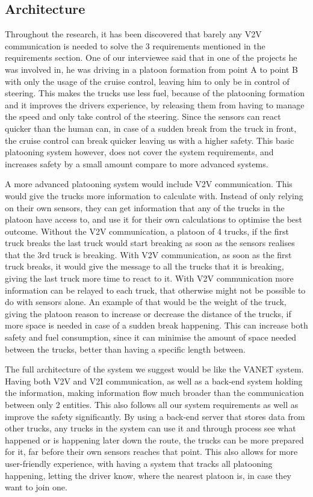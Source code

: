 \subsection{Architecture}
%
Throughout the research, it has been discovered that barely any V2V communication is needed to solve the 3 requirements mentioned in the requirements section. One of our interviewee said that in one of the projects he was involved in, he was driving in a platoon formation from point A to point B with only the usage of the cruise control, leaving him to only be in control of steering. This makes the trucks use less fuel, because of the platooning formation and it improves the drivers experience, by releasing them from having to manage the speed and only take control of the steering. Since the sensors can react quicker than the human can, in case of a sudden break from the truck in front, the cruise control can break quicker leaving us with a higher safety. This basic platooning system however, does not cover the system requirements, and increases safety by a small amount compare to more advanced systems.\par
%
A more advanced platooning system would include V2V communication. This would give the trucks more information to calculate with. Instead of only relying on their own sensors, they can get information that any of the trucks in the platoon have access to, and use it for their own calculations to optimise the best outcome. Without the V2V communication, a platoon of 4 trucks, if the first truck breaks the last truck would start breaking as soon as the sensors realises that the 3rd truck is breaking. With V2V communication, as soon as the first truck breaks, it would give the message to all the trucks that it is breaking, giving the last truck more time to react to it. With V2V communication more information can be relayed to each truck, that otherwise might not be possible to do with sensors alone. An example of that would be the weight of the truck, giving the platoon reason to increase or decrease the distance of the trucks, if more space is needed in case of a sudden break happening. This can increase both safety and fuel consumption, since it can minimise the amount of space needed between the trucks, better than having a specific length between.\par
%
The full architecture of the system we suggest would be like the VANET system. Having both V2V and V2I communication, as well as a back-end system holding the information, making information flow much broader than the communication between only 2 entities. This also follows all our system requirements as well as improve the safety significantly. By using a back-end server that stores data from other trucks, any trucks in the system can use it and through process see what happened or is happening later down the route, the trucks can be more prepared for it, far before their own sensors reaches that point. This also allows for more user-friendly experience, with having a system that tracks all platooning happening, letting the driver know, where the nearest platoon is, in case they want to join one.
% 
